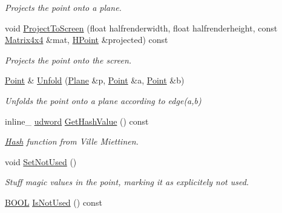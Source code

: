 \begin{DoxyCompactItemize}
\begin{DoxyCompactList}\small\item\em Projects the point onto a plane. \end{DoxyCompactList}\item 
\hypertarget{class_point_a0069c972353d11800870127a19536b8c}{void \hyperlink{class_point_a0069c972353d11800870127a19536b8c}{Project\+To\+Screen} (float halfrenderwidth, float halfrenderheight, const \hyperlink{class_matrix4x4}{Matrix4x4} \&mat, \hyperlink{class_h_point}{H\+Point} \&projected) const }\label{class_point_a0069c972353d11800870127a19536b8c}

\begin{DoxyCompactList}\small\item\em Projects the point onto the screen. \end{DoxyCompactList}\item 
\hypertarget{class_point_af5a596b6264585a391e2cefb5167f39c}{\hyperlink{class_point}{Point} \& \hyperlink{class_point_af5a596b6264585a391e2cefb5167f39c}{Unfold} (\hyperlink{class_plane}{Plane} \&p, \hyperlink{class_point}{Point} \&a, \hyperlink{class_point}{Point} \&b)}\label{class_point_af5a596b6264585a391e2cefb5167f39c}

\begin{DoxyCompactList}\small\item\em Unfolds the point onto a plane according to edge(a,b) \end{DoxyCompactList}\item 
\hypertarget{class_point_a932b34defe629f8e3b34cac5680c62ca}{inline\+\_\+ \hyperlink{_ice_types_8h_a44c6f1920ba5551225fb534f9d1a1733}{udword} \hyperlink{class_point_a932b34defe629f8e3b34cac5680c62ca}{Get\+Hash\+Value} () const }\label{class_point_a932b34defe629f8e3b34cac5680c62ca}

\begin{DoxyCompactList}\small\item\em \hyperlink{struct_hash}{Hash} function from Ville Miettinen. \end{DoxyCompactList}\item 
\hypertarget{class_point_aec2d7dcd03f7ba6ac7899704ac1983ba}{void \hyperlink{class_point_aec2d7dcd03f7ba6ac7899704ac1983ba}{Set\+Not\+Used} ()}\label{class_point_aec2d7dcd03f7ba6ac7899704ac1983ba}

\begin{DoxyCompactList}\small\item\em Stuff magic values in the point, marking it as explicitely not used. \end{DoxyCompactList}\item 
\hypertarget{class_point_aa45ff5c68f8992107a6bec19b9f40c6e}{\hyperlink{_ice_types_8h_a050c65e107f0c828f856a231f4b4e788}{B\+O\+O\+L} \hyperlink{class_point_aa45ff5c68f8992107a6bec19b9f40c6e}{Is\+Not\+Used} () const }\label{class_point_aa45ff5c68f8992107a6bec19b9f40c6e}


\end{DoxyCompactItemize}
